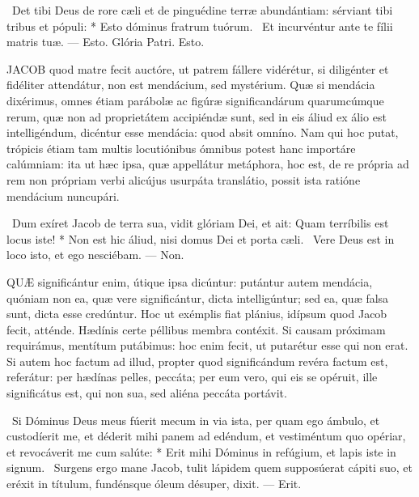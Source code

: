 \R\ Det tibi Deus de rore cæli et de pinguédine terræ abundántiam: sérviant tibi tribus et pópuli: * Esto dóminus fratrum tuórum. \V\ Et incurvéntur ante te fílii matris tuæ. --- Esto. Glória Patri. Esto.





\lettrine[lines=2]{J}{ACOB} quod matre fecit auctóre, ut patrem fállere vidérétur, si diligénter et fidéliter attendátur, non est mendácium, sed mystérium. Quæ si mendácia dixérimus, omnes étiam parábolæ ac figúræ significandárum quarumcúmque rerum, quæ non ad proprietátem accipiéndæ sunt, sed in eis áliud ex álio est intelligéndum, dicéntur esse mendácia: quod absit omníno. Nam qui hoc putat, trópicis étiam tam multis locutiónibus ómnibus potest hanc importáre calúmniam: ita ut hæc ipsa, quæ appellátur metáphora, hoc est, de re própria ad rem non própriam verbi alicújus usurpáta translátio, possit ista ratióne mendácium nuncupári.

\R\ Dum exíret Jacob de terra sua, vidit glóriam Dei, et ait: Quam terríbilis est locus iste! * Non est hic áliud, nisi domus Dei et porta cæli. \V\ Vere Deus est in loco isto, et ego nesciébam. --- Non.


\lettrine[lines=2]{Q}{UÆ} significántur enim, útique ipsa dicúntur: putántur autem mendácia, quóniam non ea, quæ vere significántur, dicta intelligúntur; sed ea, quæ falsa sunt, dicta esse credúntur. Hoc ut exémplis fiat plánius, idípsum quod Jacob fecit, atténde. Hædínis certe péllibus membra contéxit. Si causam próximam requirámus, mentítum putábimus: hoc enim fecit, ut putarétur esse qui non erat. Si autem hoc factum ad illud, propter quod significándum revéra factum est, referátur: per hædínas pelles, peccáta; per eum vero, qui eis se opéruit, ille significátus est, qui non sua, sed aliéna peccáta portávit.

\R\ Si Dóminus Deus meus fúerit mecum in via ista, per quam ego ámbulo, et custodíerit me, et déderit mihi panem ad edéndum, et vestiméntum quo opériar, et revocáverit me cum salúte: * Erit mihi Dóminus in refúgium, et lapis iste in signum. \V\ Surgens ergo mane Jacob, tulit lápidem quem supposúerat cápiti suo, et eréxit in títulum, fundénsque óleum désuper, dixit. --- Erit.

